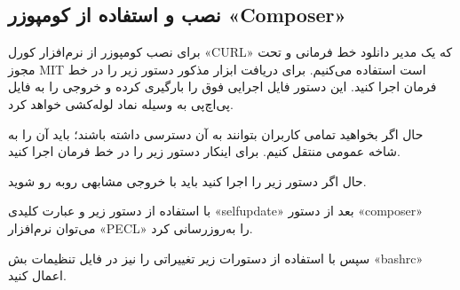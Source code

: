 \begin{latin}  
    
\end{latin}

\subsection{نصب و استفاده از کومپوزر  «Composer»}

برای نصب کومپوزر از نرم‌افزار کورل «CURL» که یک مدیر دانلود خط فرمانی و تحت مجوز MIT است استفاده می‌کنیم. برای دریافت ابزار مذکور دستور زیر را در خط فرمان اجرا کنید. این دستور فایل اجرایی فوق را بارگیری کرده و خروجی را به فایل پی‌اچ‌پی به وسیله نماد 
 لوله‌کشی خواهد کرد.
\newline

\begin{latin}  
    
\end{latin}

حال اگر بخواهید تمامی کاربران بتوانند به آن دسترسی داشته باشند؛ باید آن را به شاخه عمومی منتقل کنیم. برای اینکار دستور زیر را در خط فرمان اجرا کنید.
\begin{latin}  
    
\end{latin}
حال اگر دستور زیر را اجرا کنید باید با خروجی مشابهی روبه رو شوید.
\newline

\begin{latin}  
    
\end{latin}

با استفاده از دستور زیر و عبارت کلیدی «selfupdate» بعد از دستور «composer» می‌توان نرم‌افزار «PECL» را به‌روزرسانی کرد.
\newline

\begin{latin}  
    
\end{latin}

سپس با استفاده از دستورات زیر تغییراتی را نیز در فایل تنظیمات بش «bashrc» اعمال کنید.
\newline

\begin{latin}  
    
\end{latin}